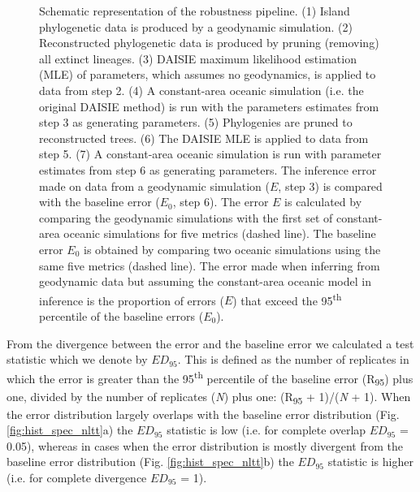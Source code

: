 \documentclass{article}
\begin{document}
\begin{figure}
    \caption{Schematic representation of the robustness pipeline. (1) Island phylogenetic data is produced by a geodynamic simulation. (2) Reconstructed phylogenetic data is produced by pruning (removing) all extinct lineages. (3) DAISIE maximum likelihood estimation (MLE) of parameters, which assumes no geodynamics, is applied to data from step 2. (4) A constant-area oceanic simulation (i.e. the original DAISIE method) is run with the parameters estimates from step 3 as generating parameters. (5) Phylogenies are pruned to reconstructed trees. (6) The DAISIE MLE is applied to data from step 5. (7) A constant-area oceanic simulation is run with parameter estimates from step 6 as generating parameters. The inference error made on data from a geodynamic simulation ($E$, step 3) is compared with the baseline error ($E_0$, step 6). The error $E$ is calculated by comparing the geodynamic simulations with the first set of constant-area oceanic simulations for five metrics (dashed line). The baseline error $E_0$ is obtained by comparing two oceanic simulations using the same five metrics (dashed line). The error made when inferring from geodynamic data but assuming the constant-area oceanic model in inference is the proportion of errors ($E$) that exceed the 95\textsuperscript{th} percentile of the baseline errors ($E_0$).}
    \label{fig:pipeline}
\end{figure}

\clearpage

From the divergence between the error and the baseline error we calculated a test statistic which we denote by $ED_{95}$. This is defined as the number of replicates in which the error is greater than the 95\textsuperscript{th} percentile of the baseline error (R\textsubscript{95}) plus one, divided by the number of replicates (\textit{N}) plus one: (R\textsubscript{95} + 1)/(\textit{N} + 1). When the error distribution largely overlaps with the baseline error distribution (Fig. \ref{fig:hist_spec_nltt}a) the $ED_{95}$ statistic is low (i.e. for complete overlap $ED_{95}$ = 0.05), whereas in cases when the error distribution is mostly divergent from the baseline error distribution (Fig. \ref{fig:hist_spec_nltt}b) the $ED_{95}$ statistic is higher (i.e. for complete divergence $ED_{95}$ = 1). \\
\end{document}
